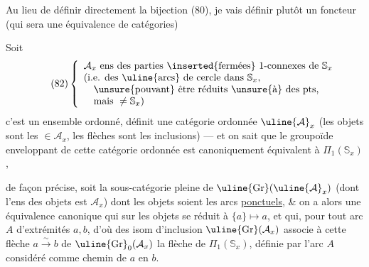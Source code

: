 Au lieu de définir directement la bijection (80), je vais définir plutôt un foncteur (qui sera une équivalence de catégories)

Soit 
\[
\tag{82}
\left\{
\begin{array}{l}
\mathcal A_x\text{ ens des parties }\inserted{\text{fermées}}\text{ }1\text{-connexes de }\mathbb S_x\\
(\text{i.e. des }\uline{\text{arcs}}\text{ de cercle dans }\mathbb S_x,\\
\quad\unsure{\text{pouvant}}\text{ être réduits }\unsure{\text{à}}\text{ des pts,}\\
\quad\text{mais }\ne\mathbb S_x)
\end{array}
\right.
\]
c'est un ensemble ordonné,   définit une catégorie ordonnée $\uline{\mathcal A}_x$ (les objets sont les $\in\mathcal A_x$, les flèches sont les inclusions) --- et on sait que le groupoïde enveloppant  de cette catégorie ordonnée est canoniquement équivalent à $\Pi_1(\mathbb S_x)$,

de façon précise, soit  la sous-catégorie pleine de $\uline{\mathrm{Gr}}(\uline{\mathcal A}_x)$ (dont l'ens des objets est $\mathcal A_x$) dont les objets soient les arcs \uline{ponctuels}, \& on a alors une équivalence canonique
qui sur les objets se réduit à $\{a\}\longmapsto a$, et qui, pour tout arc  $A$ d'extrémités $a,b$, d'où des isom d'inclusion  $\uline{\mathrm{Gr}}(\mathcal A_x)$
associe à cette flèche $a\overset{\sim}{\longrightarrow}b$ de $\uline{\mathrm{Gr}}_0(\mathcal A_x)$ la flèche de $\Pi_1(\mathbb S_x)$, définie par l'arc $A$ considéré comme chemin de $a$ en $b$.

